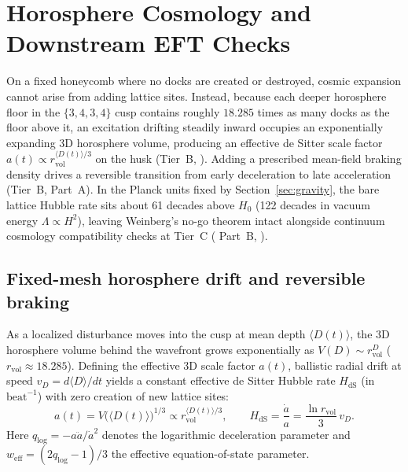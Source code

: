 \section{Horosphere Cosmology and Downstream EFT Checks}
\label{sec:cosmology}

On a fixed honeycomb where no docks are created or destroyed, cosmic expansion cannot arise from adding lattice sites.
Instead, because each deeper horosphere floor in the $\{3,4,3,4\}$ cusp contains roughly $18.285$ times as many docks
as the floor above it, an excitation drifting steadily inward occupies an exponentially expanding 3D horosphere volume,
producing an effective de Sitter scale factor $a(t) \propto r_{\mathrm{vol}}^{\langle D(t)\rangle/3}$ on the husk
(Tier~B, ). Adding a prescribed mean-field braking density drives a reversible transition from early
deceleration to late acceleration (Tier~B,  Part~A). In the Planck units fixed by
Section~\ref{sec:gravity}, the bare lattice Hubble rate sits about 61 decades above $H_0$ (122 decades in vacuum energy
$\Lambda \propto H^2$), leaving Weinberg's no-go theorem \cite{weinberg1989} intact alongside continuum cosmology
compatibility checks at Tier~C ( Part~B, ).

\subsection{Fixed-mesh horosphere drift and reversible braking}

As a localized disturbance moves into the cusp at mean depth $\langle D(t) \rangle$, the 3D horosphere volume behind
the wavefront grows exponentially as
$V(D) \sim r_{\mathrm{vol}}^D$ ($r_{\mathrm{vol}} \approx 18.285$). Defining the effective 3D scale factor $a(t)$,
ballistic radial drift at speed $v_D = d\langle D\rangle / dt$ yields a constant effective de Sitter Hubble rate
$H_{\mathrm{dS}}$ (in $\text{beat}^{-1}$) with zero creation of new lattice sites:
\begin{equation}
a(t) = V\bigl(\langle D(t)\rangle\bigr)^{1/3} \propto r_{\mathrm{vol}}^{\langle D(t)\rangle / 3},
\qquad
H_{\mathrm{dS}} = \frac{\dot{a}}{a} = \frac{\ln r_{\mathrm{vol}}}{3}\, v_D.
\label{eq:horosphere-hubble}
\end{equation}
Here $q_{\log} = -a\ddot{a}/\dot{a}^2$ denotes the logarithmic deceleration parameter and
$w_{\mathrm{eff}} = (2 q_{\log} - 1)/3$ the effective equation-of-state parameter.

